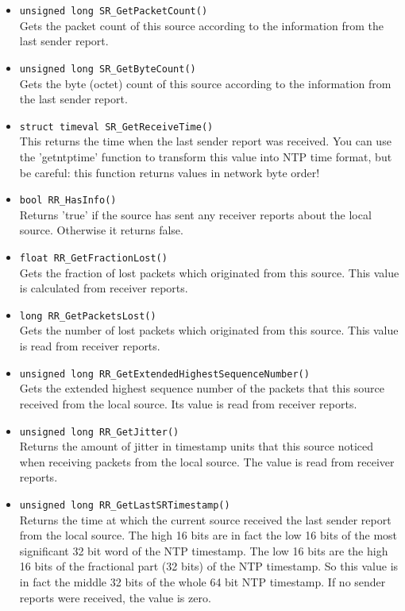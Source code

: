 \begin{itemize}
\item {\tt unsigned long SR\_GetPacketCount()}\\
	Gets the packet count of this source according to the information
	from the last sender report.

\item {\tt unsigned long SR\_GetByteCount()}\\
	Gets the byte (octet) count of this source according to the
	information from the last sender report.

\item {\tt struct timeval SR\_GetReceiveTime()}\\
 	This returns the time when the last sender report was received. You
 	can use the 'getntptime' function to transform this value into NTP
 	time format, but be careful: this function returns values in network
 	byte order!

\item {\tt bool RR\_HasInfo()}\\
	Returns 'true' if the source has sent any receiver reports about
	the local source. Otherwise it returns false.

\item {\tt float RR\_GetFractionLost()}\\
	Gets the fraction of lost packets which originated from this source.
	This value is calculated from receiver reports.

\item {\tt long RR\_GetPacketsLost()}\\
	Gets the number of lost packets which originated from this source.
	This value is read from receiver reports.
	
\item {\tt unsigned long RR\_GetExtendedHighestSequenceNumber()}\\
	Gets the extended highest sequence number of the packets that this
	source received from the local source. Its value is read from
	receiver reports.

\item {\tt unsigned long RR\_GetJitter()}\\
	Returns the amount of jitter in timestamp units that this source
	noticed when receiving packets from the local source. The value is
	read from receiver reports.

\item {\tt unsigned long RR\_GetLastSRTimestamp()}\\
	Returns the time at which the current source received the last
	sender report from the local source. The high 16 bits are in fact
	the low 16 bits of the most significant 32 bit word of the NTP
	timestamp. The low 16 bits are the high 16 bits of the fractional
	part (32 bits) of the NTP timestamp. So this value is in fact the
	middle 32 bits of the whole 64 bit NTP timestamp. If no sender
	reports were received, the value is zero.


\end{itemize}
